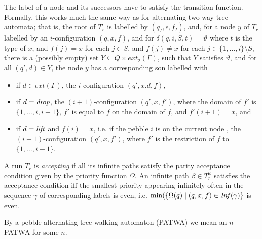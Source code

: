 \documentclass[a4paper,UKenglish,cleveref, autoref, thm-restate]{lipics-v2021}
\begin{document}
The label of a
node and its successors have to satisfy the transition function. %
Formally, this works much the same way as for alternating two-way tree automata; 
that is, the root of $T_r$ is
labelled by $(q_I,\epsilon, f_I )$, and, for a node $y$ of $T_r$ labelled by an $i$-configuration $(q, x, f)$, and 
for
$\delta(q, i, S, t) = \vartheta$ where $t$ is
the type of $x$, 
and $f(j) = x$ for each $j \in S$, and $f(j) \neq x$ for each $j \in \{1,\ldots,i \} \setminus S$,
there is a (possibly empty) set 
$Y \subseteq Q \times ext_2(\Gamma )$, such that $Y$ satisfies $\vartheta$,
and for all $(q',d) \in Y$, the node $y$ has a corresponding son
labelled with %
\begin{itemize}
\item if $d \in ext(\Gamma)$,
the $i$-configuration $(q ', x.d , f)$,
%
\item if $d = \text{\textit{drop}}$, the $(i+1)$-configuration  $ (q', x, f')$, where the domain of $f'$ is $\{ 1, \ldots, i, i+1\}$, $f'$ is equal to $f$ on the domain of $f$, and $f'(i+1) =x$, and
%
\item if $d = \text{\textit{lift}}$
and $f(i) = x$, i.e. if the pebble $i$ is on the current node%
, the $(i-1)$-configuration $(q', x, f')$, where $f'$ is the restriction of $f$ to $\{1, \ldots, i-1 \}$.
\end{itemize}








A run $T_r$ is {\em accepting} if all its infinite paths satisfy the parity acceptance 
condition 
given by the priority function $\Omega$.
An infinite path $ \beta   \in  T_r^{\omega}$  satisfies the acceptance condition iff the smallest priority appearing infinitely often in
the sequence $\gamma$ of corresponding labels
 is even, i.e.
 $\min(\{ \Omega(q) \mid (q,x,f) \in \text{\textit{Inf}}(\gamma) \} $ is even. 



By a pebble alternating tree-walking automaton (PATWA) we mean an $n$-PATWA for some $n$. 
\end{document}
